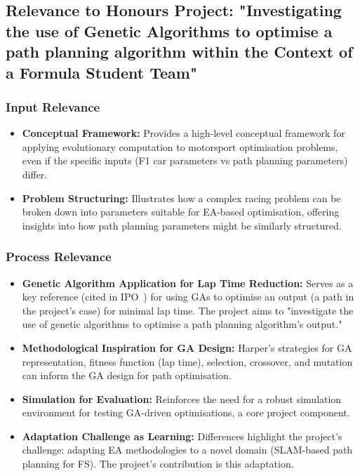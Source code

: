 \subsection{Relevance to Honours Project: "Investigating the use of Genetic Algorithms to optimise a path planning algorithm within the Context of a Formula Student Team"}\label{subsec:relevance-to-honours-project:-"investigating-the-use-of-genetic-algorithms-to-optimise-a-path-planning-algorithm-within-the-context-of-a-formula-student-team"2}
\subsubsection{Input Relevance}
\begin{itemize}
    \item \textbf{Conceptual Framework:} Provides a high-level conceptual framework for applying evolutionary computation to motorsport optimisation problems, even if the specific inputs (F1 car parameters vs path planning parameters) differ.
    \item \textbf{Problem Structuring:} Illustrates how a complex racing problem can be broken down into parameters suitable for EA-based optimisation, offering insights into how path planning parameters might be similarly structured.
\end{itemize}

\subsubsection{Process Relevance}
\begin{itemize}
    \item \textbf{Genetic Algorithm Application for Lap Time Reduction:} Serves as a key reference (cited in IPO~\cite{HarperEvolutionary}) for using GAs to optimise an output (a path in the project's case) for minimal lap time.
    The project aims to "investigate the use of genetic algorithms to optimise a path planning algorithm’s output."
    \item \textbf{Methodological Inspiration for GA Design:} Harper's strategies for GA representation, fitness function (lap time), selection, crossover, and mutation can inform the GA design for path optimisation.
    \item \textbf{Simulation for Evaluation:} Reinforces the need for a robust simulation environment for testing GA-driven optimisations, a core project component.
    \item \textbf{Adaptation Challenge as Learning:} Differences highlight the project's challenge: adapting EA methodologies to a novel domain (SLAM-based path planning for FS). The project’s contribution is this adaptation.
\end{itemize}

